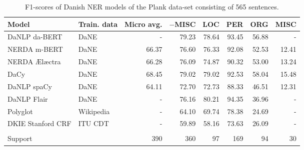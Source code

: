 \documentclass[main.tex]{subfiles}
\begin{document}
\begin{table}                                             
        \begin{center}                                    
                \begin{tabular}{l l r r r r r r}          
                        Model & Train. data & Micro avg. & $-$MISC & LOC & PER & ORG & MISC \\                      
                        \hline                            
                        DaNLP da-BERT & DaNE & - & 79.23 & 78.64 & 93.45 & 56.88 & - \\                             
                        NERDA m-BERT & DaNE & 66.37 & 76.60 & 76.33 & 92.08 & 52.53 & 12.41 \\                      
                        NERDA Ælæctra & DaNE & 66.28 & 76.09 & 74.87 & 90.32 & 53.00 & 13.24 \\                     
                        DaCy & DaNE & 68.45 & 79.02 & 79.02 & 92.53 & 58.04 & 15.48 \\                              
                        DaNLP spaCy & DaNE & 64.11 & 72.70 & 72.73 & 88.33 & 46.51 & 12.31 \\                       
                        DaNLP Flair & DaNE & - & 76.16 & 80.21 & 94.35 & 36.96 & - \\                               
                        Polyglot & Wikipedia & - & 64.10 & 69.74 & 78.38 & 24.69 & - \\                             
                        DKIE Stanford CRF & ITU CDT & - & 59.89 & 58.16 & 73.63 & 26.09 & - \\                      
                         &  &  &  &  &  &  &  \\          
                        Support &  & 390 & 360 & 97 & 169 & 94 & 30 \\                                              
                \end{tabular}                             
        \end{center}                                      
        \caption{F1\pro-scores of Danish NER models of the Plank data-set consisting of 565 sentences.}             
        \label{tab:Plank}                                 
\end{table}                                               
\end{document}
